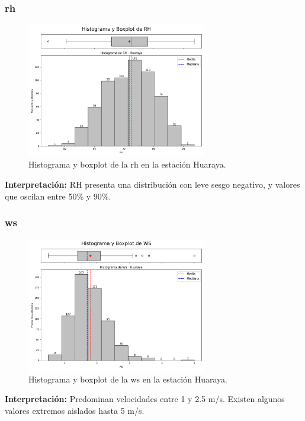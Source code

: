 \subsubsection*{\gls{rh} }
\begin{figure}[htbp]
\centering
\includegraphics[width=0.7\textwidth]{resultados/por_estacion_meteorologica/Huaraya/RH_histograma.png}
\caption{Histograma y boxplot de la \gls{rh}  en la estación Huaraya.}
\label{fig:huaraya_RH}
\end{figure}
\textbf{Interpretación:} RH presenta una distribución con leve sesgo negativo, y valores que oscilan entre 50\% y 90\%.

\subsubsection*{\gls{ws} }
\begin{figure}[htbp]
\centering
\includegraphics[width=0.7\textwidth]{resultados/por_estacion_meteorologica/Huaraya/WS_histograma.png}
\caption{Histograma y boxplot de la \gls{ws}  en la estación Huaraya.}
\label{fig:huaraya_WS}
\end{figure}
\textbf{Interpretación:} Predominan velocidades entre 1 y 2.5 m/s. Existen algunos valores extremos aislados hasta 5 m/s.

